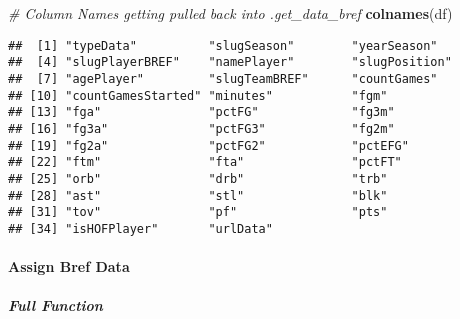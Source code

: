 \documentclass[]{article}
\newenvironment{Shaded}{\begin{snugshade}}{\end{snugshade}}
\newcommand{\KeywordTok}[1]{\textcolor[rgb]{0.13,0.29,0.53}{\textbf{#1}}}
\newcommand{\CommentTok}[1]{\textcolor[rgb]{0.56,0.35,0.01}{\textit{#1}}}
\newcommand{\NormalTok}[1]{#1}
\let\oldparagraph\paragraph
\renewcommand{\paragraph}[1]{\oldparagraph{#1}\mbox{}}
\let\oldsubparagraph\subparagraph
\renewcommand{\subparagraph}[1]{\oldsubparagraph{#1}\mbox{}}
\begin{document}
\begin{Shaded}
\begin{Highlighting}[]
\CommentTok{# Column Names getting pulled back into .get_data_bref}
\KeywordTok{colnames}\NormalTok{(df)}
\end{Highlighting}
\end{Shaded}

\begin{verbatim}
##  [1] "typeData"          "slugSeason"        "yearSeason"       
##  [4] "slugPlayerBREF"    "namePlayer"        "slugPosition"     
##  [7] "agePlayer"         "slugTeamBREF"      "countGames"       
## [10] "countGamesStarted" "minutes"           "fgm"              
## [13] "fga"               "pctFG"             "fg3m"             
## [16] "fg3a"              "pctFG3"            "fg2m"             
## [19] "fg2a"              "pctFG2"            "pctEFG"           
## [22] "ftm"               "fta"               "pctFT"            
## [25] "orb"               "drb"               "trb"              
## [28] "ast"               "stl"               "blk"              
## [31] "tov"               "pf"                "pts"              
## [34] "isHOFPlayer"       "urlData"
\end{verbatim}

\paragraph{Assign Bref Data}\label{assign-bref-data}

\subparagraph{Full Function}\label{full-function-2}
\end{document}
